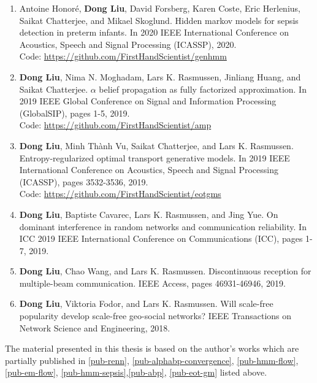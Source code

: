 \begin{enumerate}
\item \label{pub-hmm-sepsis} Antoine Honor{\'e}, \textbf{Dong Liu}, David Forsberg, Karen Coste, Eric Herlenius, Saikat Chatterjee, and Mikael Skoglund. Hidden markov models for sepsis detection in preterm infants. In 2020 IEEE International Conference on Acoustics, Speech and Signal Processing (ICASSP), 2020.\\
  Code: \href{https://github.com/FirstHandScientist/genhmm}{https://github.com/FirstHandScientist/genhmm}

\item \label{pub-abp} \textbf{Dong Liu}, Nima N. Moghadam, Lars K. Rasmussen, Jinliang Huang, and Saikat Chatterjee. $\alpha$ belief propagation as fully factorized approximation. In 2019 IEEE Global Conference on Signal and Information Processing (GlobalSIP), pages 1-5, 2019.\\
  Code: \href{https://github.com/FirstHandScientist/amp}{https://github.com/FirstHandScientist/amp}

\item \label{pub-eot-gm} \textbf{Dong Liu}, Minh Th\`{a}nh Vu, Saikat Chatterjee, and Lars K. Rasmussen. Entropy-regularized
  optimal transport generative models. In 2019 IEEE International Conference on Acoustics,
  Speech and Signal Processing (ICASSP), pages 3532-3536, 2019.\\
  Code: \href{https://github.com/FirstHandScientist/eotgms}{https://github.com/FirstHandScientist/eotgms}

\item \textbf{Dong Liu}, Baptiste Cavarec, Lars K. Rasmussen, and Jing Yue. On dominant interference in random networks and communication reliability. In ICC 2019 IEEE International Conference on Communications (ICC), pages 1-7, 2019.
  
\item \textbf{Dong Liu}, Chao Wang, and Lars K. Rasmussen. Discontinuous reception for multiple-beam communication. IEEE Access, pages 46931-46946, 2019.
  
\item \textbf{Dong Liu}, Viktoria Fodor, and Lars K. Rasmussen. Will scale-free popularity develop scale-free geo-social networks? IEEE Transactions on Network Science and Engineering, 2018.
\end{enumerate}


The material presented in this thesis is based on the author's works which are partially published in \ref{pub-renn}, \ref{pub-alphabp-convergence}, \ref{pub-hmm-flow}, \ref{pub-em-flow}, \ref{pub-hmm-sepsis},\ref{pub-abp}, \ref{pub-eot-gm} listed above.

